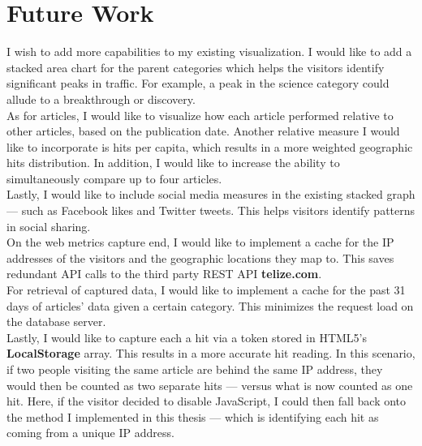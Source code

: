 \documentclass[12pt]{article}
\begin{document}
{\newpage

\section{Future Work}
I wish to add more capabilities to my existing visualization. I would like to add a stacked area chart for the parent categories which helps the visitors identify significant peaks in traffic. For example, a peak in the science category could allude to a breakthrough or discovery. \\
As for articles, I would like to visualize how each article performed relative to other articles, based on the publication date. Another relative measure I would like to incorporate is hits per capita, which results in a more weighted geographic hits distribution. In addition, I would like to increase the ability to simultaneously compare up to four articles. \\
Lastly, I would like to include social media measures in the existing stacked graph --- such as Facebook likes and Twitter tweets. This helps visitors identify patterns in social sharing.
\\On the web metrics capture end, I would like to implement a cache for the IP addresses of the visitors and the geographic locations they map to. This saves redundant API calls to the third party REST API  \textbf{telize.com}. 
\\For retrieval of captured data, I would like to implement a cache for the past 31 days of articles' data given a certain category. This minimizes the request load on the database server.
\\Lastly, I would like to capture each a hit via a token stored in HTML5's \textbf{LocalStorage} array. This results in a more accurate hit reading. In this scenario, if two people visiting the same article are behind the same IP address, they would then be counted as two separate hits --- versus what is now counted as one hit. Here, if the visitor decided to disable JavaScript, I could then fall back onto the method I implemented in this thesis --- which is identifying each hit as coming from a unique IP address.

\newpage

}
\end{document}
